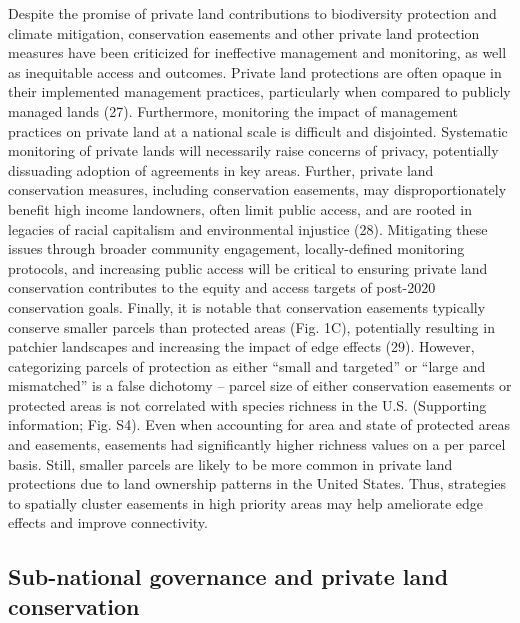 \documentclass[3p]{elsarticle} %
\begin{document}
Despite the promise of private land contributions to biodiversity
protection and climate mitigation, conservation easements and other
private land protection measures have been criticized for ineffective
management and monitoring, as well as inequitable access and outcomes.
Private land protections are often opaque in their implemented
management practices, particularly when compared to publicly managed
lands (27). Furthermore, monitoring the impact of management practices
on private land at a national scale is difficult and disjointed.
Systematic monitoring of private lands will necessarily raise concerns
of privacy, potentially dissuading adoption of agreements in key areas.
Further, private land conservation measures, including conservation
easements, may disproportionately benefit high income landowners, often
limit public access, and are rooted in legacies of racial capitalism and
environmental injustice (28). Mitigating these issues through broader
community engagement, locally-defined monitoring protocols, and
increasing public access will be critical to ensuring private land
conservation contributes to the equity and access targets of post-2020
conservation goals. Finally, it is notable that conservation easements
typically conserve smaller parcels than protected areas (Fig. 1C),
potentially resulting in patchier landscapes and increasing the impact
of edge effects (29). However, categorizing parcels of protection as
either ``small and targeted'' or ``large and mismatched'' is a false
dichotomy -- parcel size of either conservation easements or protected
areas is not correlated with species richness in the U.S. (Supporting
information; Fig. S4). Even when accounting for area and state of
protected areas and easements, easements had significantly higher
richness values on a per parcel basis. Still, smaller parcels are likely
to be more common in private land protections due to land ownership
patterns in the United States. Thus, strategies to spatially cluster
easements in high priority areas may help ameliorate edge effects and
improve connectivity.

\hypertarget{sub-national-governance-and-private-land-conservation}{%
\subsection{Sub-national governance and private land
conservation}\label{sub-national-governance-and-private-land-conservation}}
\end{document}
